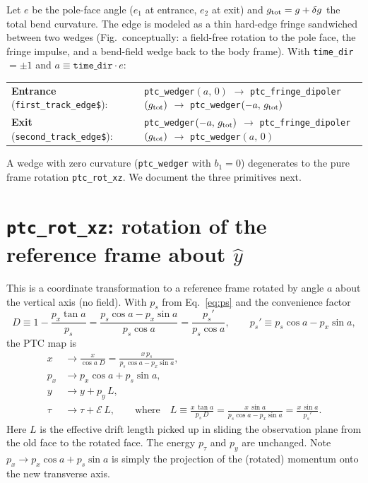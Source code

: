 \documentclass[11pt]{article}
\newcommand{\code}[1]{\texttt{#1}}
\newcommand{\ptcE}{\mathcal{E}}          %
\newcommand{\ftrack}{\code{first\_track\_edge\$}}
\newcommand{\strack}{\code{second\_track\_edge\$}}
\begin{document}
Let $e$ be the pole-face angle ($e_1$ at entrance, $e_2$ at exit) and
$g_{\rm tot} = g + \delta g$ the total bend curvature. The edge is modeled as a
thin hard-edge fringe sandwiched between two wedges (Fig.~conceptually: a
field-free rotation to the pole face, the fringe impulse, and a bend-field wedge
back to the body frame). With \code{time\_dir}$=\pm1$ and
$a \equiv \code{time\_dir}\cdot e$:
\begin{center}
\begin{tabular}{ll}
\textbf{Entrance} (\ftrack): &
  \code{ptc\_wedger}$(a,\,0)$ \;$\to$\;
  \code{ptc\_fringe\_dipoler}$(g_{\rm tot})$ \;$\to$\;
  \code{ptc\_wedger}$(-a,\,g_{\rm tot})$ \\[2pt]
\textbf{Exit} (\strack): &
  \code{ptc\_wedger}$(-a,\,g_{\rm tot})$ \;$\to$\;
  \code{ptc\_fringe\_dipoler}$(g_{\rm tot})$ \;$\to$\;
  \code{ptc\_wedger}$(a,\,0)$
\end{tabular}
\end{center}
A wedge with zero curvature (\code{ptc\_wedger} with $b_1=0$) degenerates to the
pure frame rotation \code{ptc\_rot\_xz}. We document the three primitives next.

\section{\code{ptc\_rot\_xz}: rotation of the reference frame about $\hat y$}

This is a coordinate transformation to a reference frame rotated by angle $a$
about the vertical axis (no field). With $p_s$ from Eq.~\eqref{eq:ps} and the
convenience factor
\begin{equation}
  D \equiv 1 - \frac{p_x \tan a}{p_s}
        = \frac{p_s\cos a - p_x \sin a}{p_s\cos a}
        = \frac{p_s'}{p_s\cos a},
  \qquad p_s' \equiv p_s\cos a - p_x\sin a,
\end{equation}
the PTC map is
\begin{align}
  x       &\to \frac{x}{\cos a \; D}
             = \frac{x\, p_s}{p_s\cos a - p_x\sin a}, \\
  p_x     &\to p_x\cos a + p_s\sin a, \\
  y       &\to y + p_y\,L, \\
  \tau    &\to \tau + \ptcE\,L,
  \qquad\text{where}\quad
  L \equiv \frac{x\,\tan a}{p_s\,D}
         = \frac{x\,\sin a}{p_s\cos a - p_x\sin a}
         = \frac{x\,\sin a}{p_s'} .
  \label{eq:rotL}
\end{align}
Here $L$ is the effective drift length picked up in sliding the observation plane
from the old face to the rotated face. The energy $p_\tau$ and $p_y$ are
unchanged. Note $p_x \to p_x\cos a + p_s\sin a$ is simply the projection of the
(rotated) momentum onto the new transverse axis.
\end{document}
